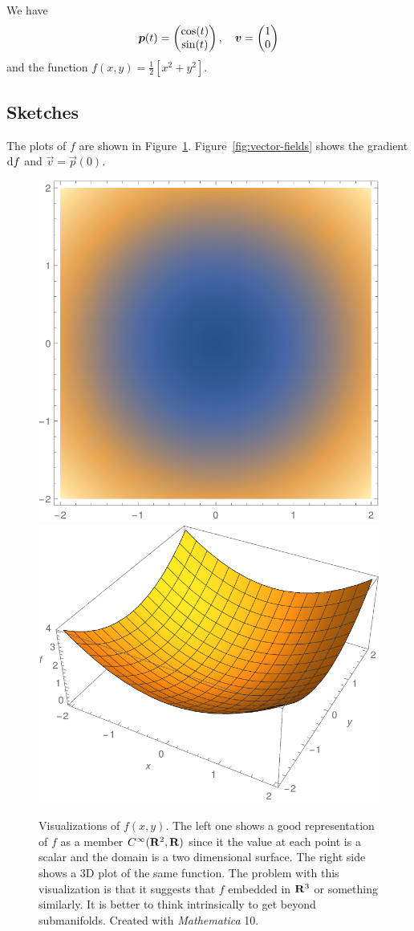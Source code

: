 \documentclass[11pt, english, fleqn, DIV=15, headinclude, BCOR=1cm]{scrartcl}
\begin{document}
We have
\[
    \boldsymbol{p}(t) =
    \begin{pmatrix}
        \cos(t) \\ \sin(t)
    \end{pmatrix}
    ,\quad
    \boldsymbol{v} =
    \begin{pmatrix}
        1 \\ 0
    \end{pmatrix}
\]
and the function $f(x, y) = \frac12 [x^2 + y^2]$.

\subsection{Sketches}

The plots of $f$ are shown in Figure~\ref{fig:f}.
Figure~\ref{fig:vector-fields} shows the gradient $\mathop{}\!\mathrm d f$ and $\vec v = \vec
p(0)$.

\begin{figure}[htbp]
    \centering
    \includegraphics[width=.45\linewidth]{headmap.pdf}
    \hfill
    \includegraphics[width=.45\linewidth]{3dplot.pdf}
    \caption{%
        Visualizations of $f(x, y)$. The left one shows a good representation
        of $f$ as a member $C^\infty(\mathbf R^2, \mathbf R)$ since it the value at each
        point is a scalar and the domain is a two dimensional surface. The
        right side shows a 3D plot of the same function. The problem with this
        visualization is that it suggests that $f$ embedded in $\mathbf R^3$ or
        something similarly. It is better to think intrinsically to get beyond
        submanifolds. Created with \emph{Mathematica} 10.
    }
    \label{fig:f}
\end{figure}
\end{document}
